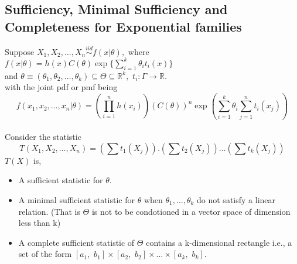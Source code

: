 \documentclass[a4paper,english,12pt]{article}
\begin{document}
\subsection{Sufficiency, Minimal Sufficiency and Completeness for Exponential families}
\begin{thm}
Suppose $X_1,X_2,\dots,X_n \overset{iid}{\sim} f(x|\theta),$ where $f(x|\theta)=h(x)C(\theta)\exp\{\sum \limits_{i=1}^k\theta_i t_i(x)\}$\\
and $\theta\equiv(\theta_1,\theta_2,\dots,\theta_k)\subseteq\Theta\subseteq\mathbb{R}^k, \,\, t_i:\Gamma\rightarrow\mathbb{R}.$\\
with the joint pdf or pmf being $$f(x_1,x_2,\dots,x_n|\theta)=\left(\prod\limits_{i=1}^n h(x_i)\right) \left(C(\theta)\right)^n \exp\left(\sum\limits_{i=1}^k \theta_i \sum\limits_{j=1}^n t_i(x_j) \right)$$\\
Consider the statistic $$T(X_1,X_2,\dots,X_n)= \left(\sum t_1(X_j)\right).\left(\sum t_2(X_j)\right)\dots \left(\sum t_k(X_j)\right)$$
$T(X)$ is,
\begin{itemize}
\item A sufficient statistic for  $\theta.$
\item A minimal sufficient statistic for $\theta$ when $\theta_1,\dots,\theta_k$ do not satisfy a linear relation. (That is $\Theta$ is not to be condotioned in a vector space of dimension less than k)
\item A complete sufficient statistic of $\Theta$ contains a k-dimensional rectangle i.e., a set of the form $[a_1,\,\, b_1]\times[a_2, \,\, b_2]\times\dots\times[a_k, \,\, b_k].$
\end{itemize}
\end{thm}
\end{document}

